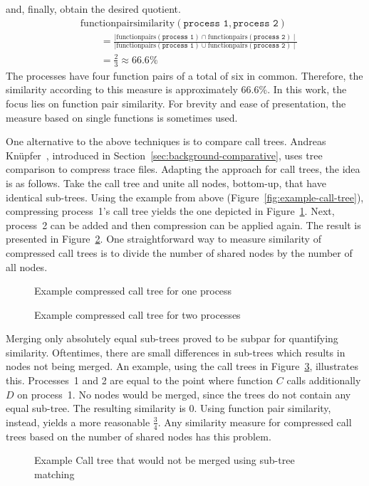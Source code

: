 \documentclass[a4paper, final, diplominf]{zih-template}
\begin{document}
and, finally, obtain the desired quotient.
\begin{equation*}
	\begin{aligned}
		& \text{functionpairsimilarity}(\texttt{process 1}, \texttt{process 2}) \\
		& \qquad = \frac{ \mid \text{functionpairs}(\texttt{process 1}) \cap \text{functionpairs}(\texttt{process 2}) \mid }{ \mid \text{functionpairs}(\texttt{process 1}) \cup \text{functionpairs}(\texttt{process 2}) \mid } \\
		& \qquad = \frac{2}{3} \approx 66.6\%
	\end{aligned}
\end{equation*}
The processes have four function pairs of a total of six in common.
Therefore, the similarity according to this measure is approximately 66.6\%.
In this work, the focus lies on function pair similarity.
For brevity and ease of presentation, the measure based on single functions is sometimes used.

One alternative to the above techniques is to compare call trees.
Andreas Kn\"upfer~\cite{knuepfer07}, introduced in Section~\ref{sec:background-comparative}, uses tree comparison to compress trace files.
Adapting the approach for call trees, the idea is as follows.
Take the call tree and unite all nodes, bottom-up, that have identical sub-trees.
Using the example from above (Figure~\ref{fig:example-call-tree}), compressing process~1's call tree yields the one depicted in Figure~\ref{fig:ccg-example-1}.
Next, process~2 can be added and then compression can be applied again.
The result is presented in Figure~\ref{fig:ccg-example-2}.
One straightforward way to measure similarity of compressed call trees is to divide the number of shared nodes by the number of all nodes.
\begin{figure}[tb]
	\centering
	
	\caption{Example compressed call tree for one process}
	\label{fig:ccg-example-1}
\end{figure}
\begin{figure}[tb]
	\centering
	
	\caption{Example compressed call tree for two processes}
	\label{fig:ccg-example-2}
\end{figure}

Merging only absolutely equal sub-trees proved to be subpar for quantifying similarity.
Oftentimes, there are small differences in sub-trees which results in nodes not being merged.
An example, using the call trees in Figure~\ref{fig:ccg-counter-example}, illustrates this.
Processes~1 and 2 are equal to the point where function $C$ calls additionally $D$ on process~1.
No nodes would be merged, since the trees do not contain any equal sub-tree.
The resulting similarity is 0.
Using function pair similarity, instead, yields a more reasonable $\frac{3}{4}$.
Any similarity measure for compressed call trees based on the number of shared nodes has this problem.
\begin{figure}[tb]
	\centering
	
	\caption{Example Call tree that would not be merged using sub-tree matching}
	\label{fig:ccg-counter-example}
\end{figure}
\end{document}
